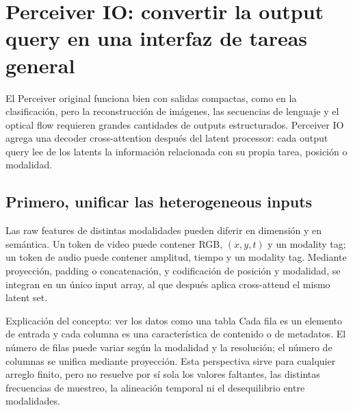 \section{Perceiver IO: convertir la output query en una interfaz de tareas general}

El Perceiver original funciona bien con salidas compactas, como en la clasificación, pero la reconstrucción de imágenes, las secuencias de lenguaje y el optical flow requieren grandes cantidades de outputs estructurados. Perceiver IO agrega una decoder cross-attention después del latent processor: cada output query lee de los latents la información relacionada con su propia tarea, posición o modalidad.

\subsection{Primero, unificar las heterogeneous inputs}

Las raw features de distintas modalidades pueden diferir en dimensión y en semántica. Un token de video puede contener RGB, $(x,y,t)$ y un modality tag; un token de audio puede contener amplitud, tiempo y un modality tag. Mediante proyección, padding o concatenación, y codificación de posición y modalidad, se integran en un único input array, al que después aplica cross-attend el mismo latent set.


\begin{knowledgebox}{Explicación del concepto: ver los datos como una tabla}
Cada fila es un elemento de entrada y cada columna es una característica de contenido o de metadatos. El número de filas puede variar según la modalidad y la resolución; el número de columnas se unifica mediante proyección. Esta perspectiva sirve para cualquier arreglo finito, pero no resuelve por sí sola los valores faltantes, las distintas frecuencias de muestreo, la alineación temporal ni el desequilibrio entre modalidades.
\end{knowledgebox}


